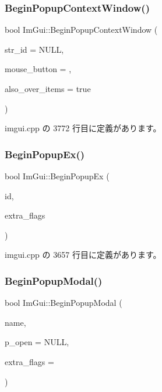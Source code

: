 \subsubsection{\texorpdfstring{Begin\+Popup\+Context\+Window()}{BeginPopupContextWindow()}}
{\footnotesize\ttfamily bool Im\+Gui\+::\+Begin\+Popup\+Context\+Window (\begin{DoxyParamCaption}\item[{const char $\ast$}]{str\+\_\+id = {\ttfamily NULL},  }\item[{int}]{mouse\+\_\+button = {},  }\item[{bool}]{also\+\_\+over\+\_\+items = {\ttfamily true} }\end{DoxyParamCaption})}



 imgui.\+cpp の 3772 行目に定義があります。

\mbox{\label{namespace_im_gui_a89da3a22300e8293257b6cfdf1b83b7a}} 
\subsubsection{\texorpdfstring{Begin\+Popup\+Ex()}{BeginPopupEx()}}
{\footnotesize\ttfamily bool Im\+Gui\+::\+Begin\+Popup\+Ex (\begin{DoxyParamCaption}\item[{\mbox{\hyperlink{imgui_8h_a1785c9b6f4e16406764a85f32582236f}{Im\+Gui\+ID}}}]{id,  }\item[{\mbox{\hyperlink{imgui_8h_a0b8e067ab4f7a818828c8d89e531addc}{Im\+Gui\+Window\+Flags}}}]{extra\+\_\+flags }\end{DoxyParamCaption})}



 imgui.\+cpp の 3657 行目に定義があります。

\mbox{\label{namespace_im_gui_aa70aaf1dacf5702f85feca6f729a307a}} 
\subsubsection{\texorpdfstring{Begin\+Popup\+Modal()}{BeginPopupModal()}}
{\footnotesize\ttfamily bool Im\+Gui\+::\+Begin\+Popup\+Modal (\begin{DoxyParamCaption}\item[{const char $\ast$}]{name,  }\item[{bool $\ast$}]{p\+\_\+open = {\ttfamily NULL},  }\item[{\mbox{\hyperlink{imgui_8h_a0b8e067ab4f7a818828c8d89e531addc}{Im\+Gui\+Window\+Flags}}}]{extra\+\_\+flags = {} }\end{DoxyParamCaption})}



